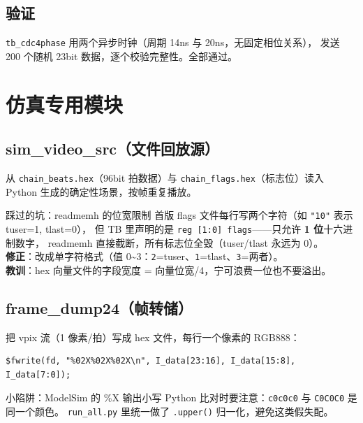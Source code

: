\subsection{验证}

\texttt{tb\_cdc4phase} 用两个异步时钟（周期 14ns 与 20ns，无固定相位关系），
发送 200 个随机 23bit 数据，逐个校验完整性。全部通过。

\section{仿真专用模块}

\subsection{sim\_video\_src（文件回放源）}

从 \texttt{chain\_beats.hex}（96bit 拍数据）与 \texttt{chain\_flags.hex}（标志位）读入
Python 生成的确定性场景，按帧重复播放。

\begin{warnbox}{踩过的坑：readmemh 的位宽限制}
首版 flags 文件每行写两个字符（如 \texttt{"10"} 表示 tuser=1, tlast=0），
但 TB 里声明的是 \texttt{reg [1:0] flags}——只允许 \textbf{1 位}十六进制数字，
readmemh 直接截断，所有标志位全毁（tuser/tlast 永远为 0）。\\[4pt]
\textbf{修正}：改成单字符格式（值 0\textasciitilde 3：\texttt{2}=tuser、\texttt{1}=tlast、\texttt{3}=两者）。\\[4pt]
\textbf{教训}：hex 向量文件的字段宽度 = 向量位宽/4，宁可浪费一位也不要溢出。
\end{warnbox}

\subsection{frame\_dump24（帧转储）}

把 vpix 流（1 像素/拍）写成 hex 文件，每行一个像素的 RGB888：

\begin{Verbatim}[frame=single,fontsize=\small]
$fwrite(fd, "%02X%02X%02X\n", I_data[23:16], I_data[15:8], I_data[7:0]);
\end{Verbatim}

\begin{tipbox}{小陷阱：ModelSim 的 \%X 输出小写}
Python 比对时要注意：\texttt{c0c0c0} 与 \texttt{C0C0C0} 是同一个颜色。
\texttt{run\_all.py} 里统一做了 \texttt{.upper()} 归一化，避免这类假失配。
\end{tipbox}

